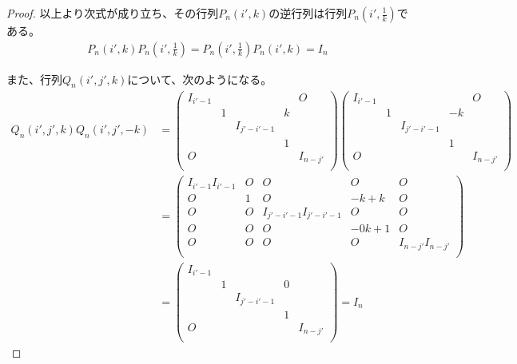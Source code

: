 \documentclass[dvipdfmx]{jsarticle}
\begin{document}
\begin{proof}
以上より次式が成り立ち、その行列$P_{n}\left( i',k \right)$の逆行列は行列$P_{n}\left( i',\frac{1}{k} \right)$である。
\begin{align*}
P_{n}\left( i',k \right)P_{n}\left( i',\frac{1}{k} \right) = P_{n}\left( i',\frac{1}{k} \right)P_{n}\left( i',k \right) = I_{n}
\end{align*}\par
また、行列$Q_{n}\left( i',j',k \right)$について、次のようになる。
\begin{align*}
Q_{n}\left( i',j',k \right)Q_{n}\left( i',j', - k \right) &= \begin{pmatrix}
I_{i' - 1} & \  & \  & \  & O \\
\  & 1 & \  & k & \  \\
\  & \  & I_{j' - i' - 1} & \  & \  \\
\  & \  & \  & 1 & \  \\
O & \  & \  & \  & I_{n - j'} \\
\end{pmatrix}\begin{pmatrix}
I_{i' - 1} & \  & \  & \  & O \\
\  & 1 & \  & - k & \  \\
\  & \  & I_{j' - i' - 1} & \  & \  \\
\  & \  & \  & 1 & \  \\
O & \  & \  & \  & I_{n - j'} \\
\end{pmatrix}\\
&= \begin{pmatrix}
I_{i' - 1}I_{i' - 1} & O & O & O & O \\
O & 1 & O & - k + k & O \\
O & O & I_{j' - i' - 1}I_{j' - i' - 1} & O & O \\
O & O & O & - 0k + 1 & O \\
O & O & O & O & I_{n - j'}I_{n - j'} \\
\end{pmatrix}\\
&= \begin{pmatrix}
I_{i' - 1} & \  & \  & \  & \  \\
\  & 1 & \  & 0 & \  \\
\  & \  & I_{j' - i' - 1} & \  & \  \\
\  & \  & \  & 1 & \  \\
O & \  & \  & \  & I_{n - j'} \\
\end{pmatrix} = I_{n}
\end{align*}

\end{proof}
\end{document}
